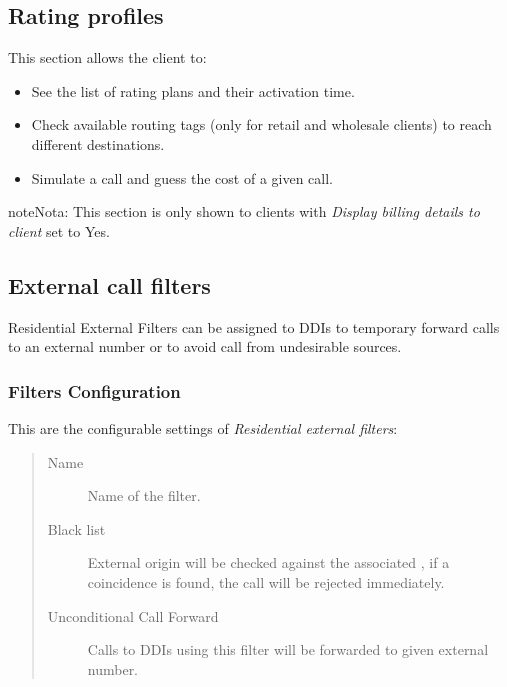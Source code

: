 \documentclass[letterpaper,10pt,spanish]{sphinxmanual}
\begin{document}
\subsection{Rating profiles}
\label{administration_portal/client/residential/rating_profiles:rating-profiles}\label{administration_portal/client/residential/rating_profiles::doc}
This section allows the client to:
\begin{itemize}
\item {} 
See the list of rating plans and their activation time.

\item {} 
Check available routing tags (only for retail and wholesale clients) to reach different destinations.

\item {} 
Simulate a call and guess the cost of a given call.

\end{itemize}

\begin{notice}{note}{Nota:}
This section is only shown to clients with \emph{Display billing details to client} set to Yes.
\end{notice}


\subsection{External call filters}
\label{administration_portal/client/residential/external_call_filters:external-call-filters}\label{administration_portal/client/residential/external_call_filters:residential-filters}\label{administration_portal/client/residential/external_call_filters::doc}
Residential External Filters can be assigned to DDIs to temporary
forward calls to an external number or to avoid call from undesirable sources.


\subsubsection{Filters Configuration}
\label{administration_portal/client/residential/external_call_filters:filters-configuration}
This are the configurable settings of \emph{Residential external filters}:
\begin{quote}
\begin{description}
\item[{Name}] \leavevmode
Name of the filter.

\item[{Black list}] \leavevmode
External origin will be checked against the associated {\hyperref[administration_portal/client/vpbx/routing_tools/match_lists:match\string-lists]{}},
if a coincidence is found, the call will be rejected immediately.

\item[{Unconditional Call Forward}] \leavevmode
Calls to DDIs using this filter will be forwarded to given external number.

\end{description}
\end{quote}
\end{document}
